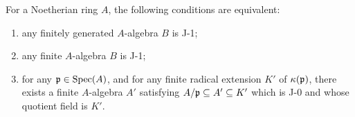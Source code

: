 \documentclass[../main]{subfiles}
\begin{document}
\begin{theorem}
\label{thm:073}
For a Noetherian ring $A$, the following conditions are equivalent:

\begin{enumerate}[label = (\arabic*)]
    \item any finitely generated $A$-algebra $B$ is J-1;
    \item any finite $A$-algebra $B$ is J-1;
    \item for any $\mathfrak{p} \in \operatorname{Spec}(A)$, and for any finite radical extension $K'$ of $\kappa(\mathfrak{p})$, there exists a finite $A$-algebra $A'$ satisfying $A/\mathfrak{p} \subseteq A' \subseteq K'$ which is J-0 and whose quotient field is $K'$. 
\end{enumerate}
\end{theorem}
\end{document}
